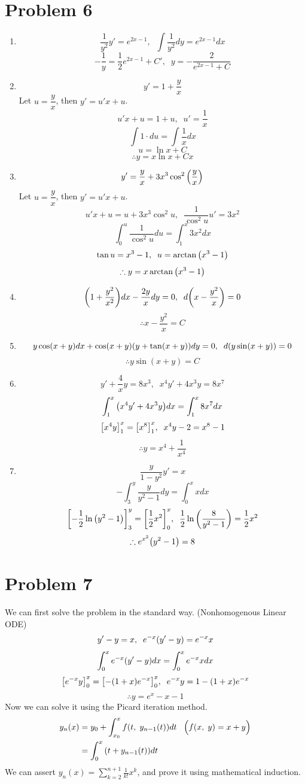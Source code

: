 \documentclass[10pt]{article}
\begin{document}
\section*{Problem 6}
\begin{enumerate}[leftmargin=*, label={(\alph*)}]
    \item $$\frac{1}{y^2}y' = e^{2x-1}, \;\; \int\frac{1}{y^2}dy = e^{2x-1}dx$$
    $$-\frac{1}{y} = \frac{1}{2}e^{2x-1} + C', \;\; y = -\frac{2}{e^{2x-1}+C}$$
    \item $$y' = 1 + \frac{y}{x}$$
    Let $u = \dfrac{y}{x}$, then $y' = u'x + u$.
    $$u'x + u = 1 + u, \;\; u' = \frac{1}{x}$$
    $$\int1\cdot du = \int\frac{1}{x}dx$$
    $$u = \ln{x} + C$$
    $$\therefore y = x\ln{x} + Cx$$
    \item $$y' = \frac{y}{x} + 3x^3\cos^2\qty(\frac{y}{x})$$
    Let $u = \dfrac{y}{x}$, then $y' = u'x + u$.
    $$u'x + u = u + 3x^3\cos^2u, \;\; \frac{1}{\cos^2u}u' = 3x^2$$
    $$\int_0^u\frac{1}{\cos^2u}du = \int_1^x3x^2dx$$
    $$\tan{u} = x^3 - 1, \;\; u = \arctan\qty(x^3 - 1)$$
    $$\therefore y = x\arctan\qty(x^3 - 1)$$
    \item $$\qty(1 + \frac{y^2}{x^2})dx - \frac{2y}{x}dy = 0, \;\; d\qty(x - \frac{y^2}{x}) = 0$$
    $$\therefore x - \frac{y^2}{x} = C$$
    \item $$y\cos(x+y)dx + \cos(x+y)(y+\tan(x+y))dy = 0, \;\; d\qty(y\sin(x+y)) = 0$$
    $$\therefore y\sin(x+y) = C$$
    \item $$y' + \frac{4}{x}y = 8x^3, \;\; x^4y' + 4x^3y = 8x^7$$
    $$\int_{1}^{x}\qty(x^4y' + 4x^3y)dx = \int_{1}^{x}8x^7dx$$
    $$\qty[x^4y]_1^x = \qty[x^8]_1^x, \;\; x^4y - 2 = x^8 - 1$$
    $$\therefore y = x^4 + \frac{1}{x^4}$$
    \item $$\frac{y}{1-y^2}y' = x$$
    $$-\int_3^y\frac{y}{y^2-1}dy = \int_0^xxdx$$
    $$\qty[-\frac{1}{2}\ln\qty(y^2-1)]_3^y = \qty[\frac{1}{2}x^2]_0^x, \;\; \frac{1}{2}\ln\qty(\frac{8}{y^2-1}) = \frac{1}{2}x^2$$
    $$\therefore e^{x^2}\qty(y^2-1) = 8$$
\end{enumerate}

\section*{Problem 7}
We can first solve the problem in the standard way. (Nonhomogenous Linear ODE)
$$y' - y = x, \;\; e^{-x}\qty(y' - y) = e^{-x}x$$
$$\int_{0}^{x}e^{-x}\qty(y' - y)dx = \int_{0}^{x}e^{-x}xdx$$
$$\qty[e^{-x}y]_0^x = \qty[-(1+x)e^{-x}]_0^x, \;\; e^{-x}y = 1-(1+x)e^{-x}$$
$$\therefore y = e^x - x - 1$$
Now we can solve it using the Picard iteration method.
\begin{align*}
    y_n(x) &= y_0 + \int_{x_0}^{x}f\qty(t,\; y_{n-1}(t))dt \;\;\; \Big(f(x, \; y) = x + y\Big)\\
    &= \int_0^x\qty(t + y_{n-1}(t))dt
\end{align*}
We can assert $\displaystyle y_n(x) = \sum_{k=2}^{n+1}\frac{1}{k!}x^k$, and prove it using mathematical induction.
\vspace{2mm}
\end{document}
